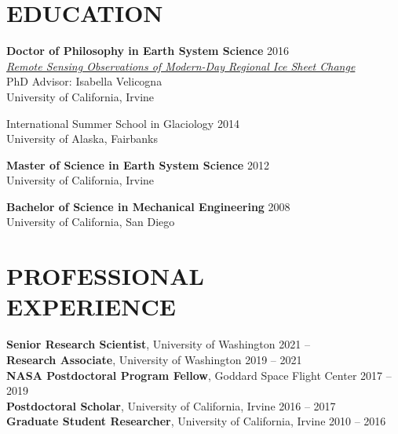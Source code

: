 \documentclass[margin,line,11pt]{res}
\begin{document}


\address{email: \href{mailto:tsutterl@uw.edu}{tsutterl@uw.edu}}
\address{website: \href{https://tsutterley.github.io}{tsutterley.github.io}}

\begin{resume}

\section{EDUCATION}
	{\bf Doctor of Philosophy in Earth System Science} \hfill 2016  \\
		{\em\href{http://search.proquest.com/docview/1794656381}{Remote Sensing Observations of Modern-Day Regional Ice Sheet Change}} \\
		PhD Advisor: Isabella Velicogna \\
		University of California, Irvine

	International Summer School in Glaciology \hfill 2014\\
	University of Alaska, Fairbanks

	{\bf Master of Science in Earth System Science} \hfill 2012  \\
		University of California, Irvine

	{\bf Bachelor of Science in Mechanical Engineering} \hfill 2008  \\
		University of California, San Diego

\section{PROFESSIONAL \\ EXPERIENCE}
	{\bf Senior Research Scientist}, University of Washington \hfill 2021 -- \\ %
	{\bf Research Associate}, University of Washington \hfill 2019 -- 2021 \\ %
	{\bf NASA Postdoctoral Program Fellow}, Goddard Space Flight Center \hfill 2017 -- 2019\\
	{\bf Postdoctoral Scholar}, University of California, Irvine \hfill 2016 -- 2017 \\
	{\bf Graduate Student Researcher}, University of California, Irvine \hfill 2010 -- 2016 \\


\end{resume}
\end{document}
